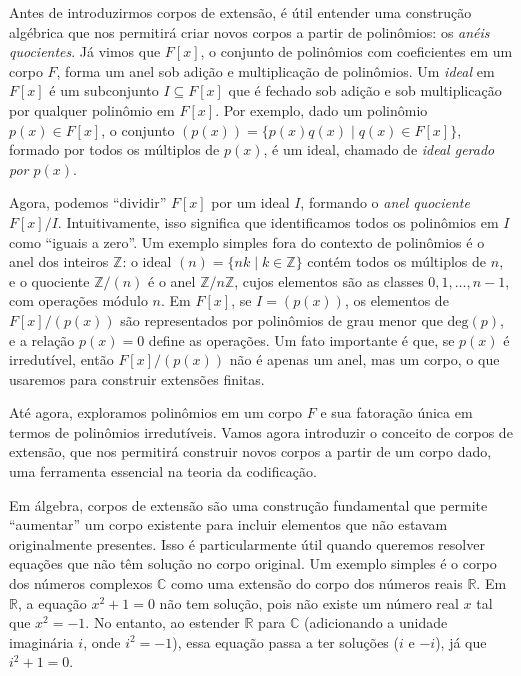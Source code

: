 Antes de introduzirmos corpos de extensão, é útil entender uma construção
algébrica que nos permitirá criar novos corpos a partir de polinômios: os
\emph{anéis quocientes}. Já vimos que $F[x]$, o conjunto de polinômios com
coeficientes em um corpo $F$, forma um anel sob adição e multiplicação de
polinômios. Um \emph{ideal} em $F[x]$ é um subconjunto $I \subseteq F[x]$ que é
fechado sob adição e sob multiplicação por qualquer polinômio em $F[x]$. Por
exemplo, dado um polinômio $p(x) \in F[x]$, o conjunto $(p(x)) = \{ p(x) q(x) \mid q(x) \in F[x] \}$,
formado por todos os múltiplos de $p(x)$, é um ideal,
chamado de \emph{ideal gerado por $p(x)$}.

Agora, podemos ``dividir'' $F[x]$ por um ideal $I$, formando o \emph{anel
quociente} $F[x] / I$. Intuitivamente, isso significa que identificamos todos
os polinômios em $I$ como ``iguais a zero''. Um exemplo simples fora do contexto
de polinômios é o anel dos inteiros $\mathbb{Z}$: o ideal $(n) = \{ n k \mid k \in \mathbb{Z} \}$
contém todos os múltiplos de $n$, e o quociente
$\mathbb{Z}/(n)$ é o anel $\mathbb{Z}/n\mathbb{Z}$, cujos elementos são as
classes $0, 1, \ldots, n-1$, com operações módulo $n$. Em $F[x]$, se $I = (p(x))$,
os elementos de $F[x] / (p(x))$ são representados por polinômios de
grau menor que $\text{deg}(p)$, e a relação $p(x) = 0$ define as operações. Um
fato importante é que, se $p(x)$ é irredutível, então $F[x] / (p(x))$ não é
apenas um anel, mas um corpo, o que usaremos para construir extensões finitas.




Até agora, exploramos polinômios em um corpo $F$ e sua fatoração única em
termos de polinômios irredutíveis. Vamos agora introduzir o conceito de corpos
de extensão, que nos permitirá construir novos corpos a partir de um corpo
dado, uma ferramenta essencial na teoria da codificação.

Em álgebra, corpos de extensão são uma construção fundamental que permite
``aumentar'' um corpo existente para incluir elementos que não estavam
originalmente presentes. Isso é particularmente útil quando queremos resolver
equações que não têm solução no corpo original. Um exemplo simples é o corpo
dos números complexos $\mathbb{C}$ como uma extensão do corpo dos números reais
$\mathbb{R}$. Em $\mathbb{R}$, a equação $x^2 + 1 = 0$ não tem solução, pois
não existe um número real $x$ tal que $x^2 = -1$. No entanto, ao estender
$\mathbb{R}$ para $\mathbb{C}$ (adicionando a unidade imaginária $i$, onde $i^2 = -1$),
essa equação passa a ter soluções ($i$ e $-i$), já que $i^2 + 1 = 0$.

